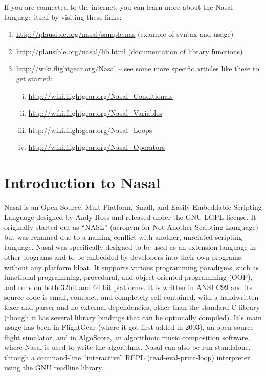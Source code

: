\documentclass{article}
\newcommand{\todo}[1]{}
\begin{document}
If you are connected to the internet, you can learn more about the Nasal language itself by visiting these links:
\begin{enumerate}
 \item \url{http://plausible.org/nasal/sample.nas} (example of syntax and usage)
 \item \url{http://plausible.org/nasal/lib.html} (documentation of library functions)
 \item \url{http://wiki.flightgear.org/Nasal} -- see some more specific articles like these to get started:
 \begin{enumerate}[i.]
  \item \url{http://wiki.flightgear.org/Nasal_Conditionals}
  \item \url{http://wiki.flightgear.org/Nasal_Variables}
  \item \url{http://wiki.flightgear.org/Nasal_Loops}
  \item \url{http://wiki.flightgear.org/Nasal_Operators}
 \end{enumerate}
\end{enumerate}


\section{Introduction to Nasal}
\todo{see Andy's original design document: \url{http://plausible.org/nasal/doc.html} }

Nasal is an Open-Source, Mult-Platform, Small, and Easily Embeddable Scripting Language designed by Andy Ross and released under the GNU LGPL license.  It originally started out as ``NASL'' (acronym for Not Another Scripting Language) but was renamed due to a naming conflict with another, unrelated scripting language.  Nasal was specifically designed to be used as an extension language in other programs and to be embedded by developers into their own programs, without any platform bloat.  It supports various programming paradigms, such as functional programming, procedural, and object oriented programming (OOP), and runs on both 32bit and 64 bit platforms.  It is written in ANSI C99 and its source code is small, compact, and completely self-contained, with a handwritten lexer and parser and no external dependencies, other than the standard C library (though it has several library bindings that can be optionally compiled).  It's main usage has been in FlightGear (where it got first added in 2003), an open-source flight simulator, and in AlgoScore, an algorithmic music composition software, where Nasal is used to write the algorithms.  Nasal can also be run standalone, through a command-line ``interactive'' REPL (read-eval-print-loop) interpreter using the GNU readline library.
\end{document}
